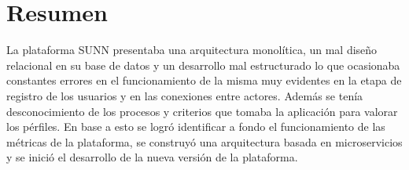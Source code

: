 \chapter*{Resumen}
La plataforma SUNN presentaba una arquitectura monolítica, un mal diseño relacional en su
base  de  datos  y  un  desarrollo  mal  estructurado  lo  que  ocasionaba  constantes  errores  en  el
funcionamiento de la misma muy evidentes en la etapa de registro de los usuarios y en las
conexiones entre actores.  Además se tenía desconocimiento de los procesos y criterios que
tomaba  la  aplicación  para  valorar  los  pérfiles.   En  base  a  esto  se  logró  identificar  a  fondo
el funcionamiento de las métricas de la plataforma, se construyó una arquitectura basada en
microservicios y se inició el desarrollo de la nueva versión de la plataforma.
